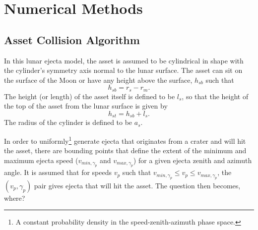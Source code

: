 \documentclass{article}
\begin{document}
\section{Numerical Methods}\label{sec:Numerical Methods}

\subsection{Asset Collision Algorithm}\label{ssec:Asset Collision Algorithm}

In this lunar ejecta model, the asset is assumed to be cylindrical in shape with the cylinder's symmetry axis normal to the lunar surface. The asset can sit on the surface of the Moon or have any height above the surface, $h_{sb}$ such that
\begin{equation}
h_{sb} = r_s - r_m.
\end{equation}
The height (or length) of the asset itself is defined to be $l_s$, so that the height of the top of the asset from the lunar surface is given by
\begin{equation}
h_{st} = h_{sb} + l_s.
\end{equation}
The radius of the cylinder is defined to be $a_s$.

In order to uniformly\footnote{A constant probability density in the speed-zenith-azimuth phase space.} generate ejecta that originates from a crater and will hit the asset, there are bounding points that define the extent of the minimum and maximum ejecta speed ($v_{min,\gamma_p}$ and $v_{max,\gamma_p}$) for a given ejecta zenith and azimuth angle. It is assumed that for speeds $v_p$ such that $v_{min,\gamma_p} \le v_p \le v_{max,\gamma_p}$, the $(v_p, \gamma_p)$ pair gives ejecta that will hit the asset. The question then becomes, where?
\end{document}
